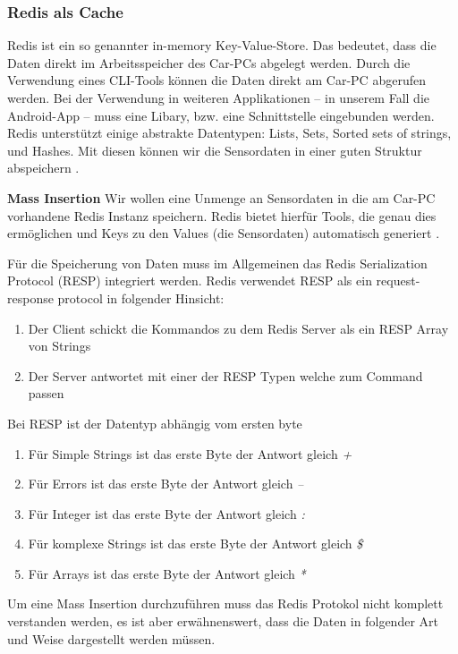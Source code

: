 \subsubsection{Redis als Cache}
Redis ist ein so genannter in-memory Key-Value-Store. Das bedeutet, dass die Daten direkt im Arbeitsspeicher des Car-PCs abgelegt werden. Durch die Verwendung eines CLI-Tools können die Daten direkt am Car-PC abgerufen werden. Bei der Verwendung in weiteren Applikationen – in unserem Fall die Android-App – muss eine Libary, bzw. eine Schnittstelle eingebunden werden. Redis unterstützt einige abstrakte Datentypen: Lists, Sets, Sorted sets of strings, und Hashes. Mit diesen können wir die Sensordaten in einer guten Struktur abspeichern \cite{MELD.CH3-redis.mainWebsite}.

\textbf{Mass Insertion\newline}
Wir wollen eine Unmenge an Sensordaten in die am Car-PC vorhandene Redis Instanz speichern. Redis bietet hierfür Tools, die genau dies ermöglichen und Keys zu den Values (die Sensordaten) automatisch generiert \cite{MELD.CH3-redis.documentation}.

Für die Speicherung von Daten muss im Allgemeinen das Redis Serialization Protocol (RESP) integriert werden. Redis verwendet RESP als ein request-response protocol in folgender Hinsicht: 
\begin{enumerate}
\item Der Client schickt die Kommandos zu dem Redis Server als ein RESP Array von Strings
\item Der Server antwortet mit einer der RESP Typen welche zum Command passen
\end{enumerate}

Bei RESP ist der Datentyp abhängig vom ersten byte
\begin{enumerate}
\item Für Simple Strings ist das erste Byte der Antwort gleich \textit{+}
\item Für Errors ist das erste Byte der Antwort gleich \textit{–}
\item Für Integer ist das erste Byte der Antwort gleich \textit{:}
\item Für komplexe Strings ist das erste Byte der Antwort gleich \textit{\$}
\item Für Arrays ist das erste Byte der Antwort gleich \textit{*}
\end{enumerate}

Um eine Mass Insertion durchzuführen muss das Redis Protokol nicht komplett verstanden werden, es ist aber erwähnenswert, dass die Daten in folgender Art und Weise dargestellt werden müssen.

